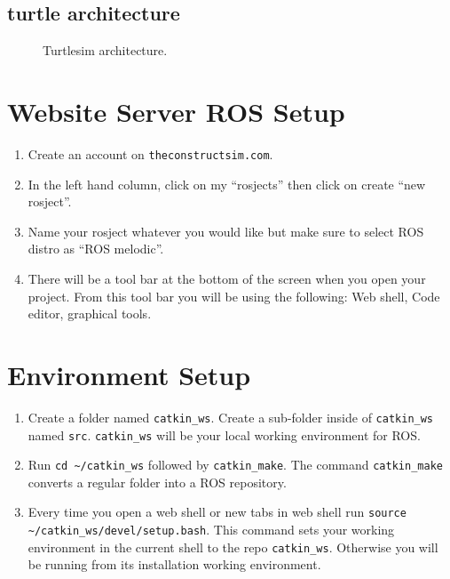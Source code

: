 \documentclass[11pt]{article}
\begin{document}
\subsection{turtle architecture}
\begin{figure}[ht]
\centering
{}
\caption{Turtlesim architecture.}
\end{figure}

\section{Website Server ROS Setup}
\begin{enumerate}
\item Create an account on \texttt{theconstructsim.com}.
\item In the left hand column, click on my ``rosjects'' then click on create ``new rosject''.
\item Name your rosject whatever you would like but make sure to select ROS distro as ``ROS melodic''.
\item There will be a tool bar at the bottom of the screen when you open your project. From this tool bar you will be using the following: Web shell, Code editor, graphical tools.
\end{enumerate}

\section{Environment Setup}
\begin{enumerate}
\item Create a folder named \texttt{catkin\_ws}. Create a sub-folder inside of \texttt{catkin\_ws} named \texttt{src}. \texttt{catkin\_ws} will be your local working environment for ROS.
\item Run \texttt{cd \textasciitilde/catkin\_ws} followed by \texttt{catkin\_make}. The command \texttt{catkin\_make} converts a regular folder into a ROS repository.
\item Every time you open a web shell or new tabs in web shell run \texttt{source \textasciitilde/catkin\_ws/devel/setup.bash}. This command sets your working environment in the current shell to the repo \texttt{catkin\_ws}. Otherwise you will be running from its installation working environment.
\end{enumerate}
\end{document}
